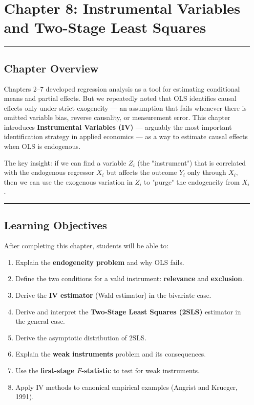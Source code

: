 \chapter{Chapter 8: Instrumental Variables and Two-Stage Least Squares}

\medskip\hrule\medskip

\section{Chapter Overview}

Chapters 2--7 developed regression analysis as a tool for estimating conditional means and partial effects. But we repeatedly noted that OLS identifies causal effects only under strict exogeneity --- an assumption that fails whenever there is omitted variable bias, reverse causality, or measurement error. This chapter introduces \textbf{Instrumental Variables (IV)} --- arguably the most important identification strategy in applied economics --- as a way to estimate causal effects when OLS is endogenous.

The key insight: if we can find a variable $Z_i$ (the "instrument") that is correlated with the endogenous regressor $X_i$ but affects the outcome $Y_i$ only through $X_i$, then we can use the exogenous variation in $Z_i$ to "purge" the endogeneity from $X_i$.

\medskip\hrule\medskip

\section{Learning Objectives}

After completing this chapter, students will be able to:

\begin{enumerate}
\item Explain the \textbf{endogeneity problem} and why OLS fails.
\item Define the two conditions for a valid instrument: \textbf{relevance} and \textbf{exclusion}.
\item Derive the \textbf{IV estimator} (Wald estimator) in the bivariate case.
\item Derive and interpret the \textbf{Two-Stage Least Squares (2SLS)} estimator in the general case.
\item Derive the asymptotic distribution of 2SLS.
\item Explain the \textbf{weak instruments} problem and its consequences.
\item Use the \textbf{first-stage $F$-statistic} to test for weak instruments.
\item Apply IV methods to canonical empirical examples (Angrist and Krueger, 1991).
\end{enumerate}

